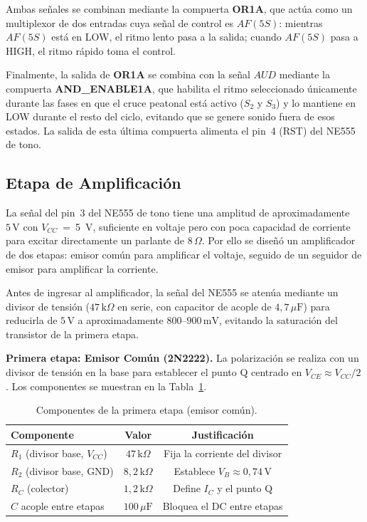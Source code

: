 \documentclass[12pt,onecolumn]{IEEEtran}
\begin{document}
Ambas señales se combinan mediante la compuerta \textbf{OR1A}, que actúa como un multiplexor de dos entradas cuya señal de control es $AF(5S)$: mientras $AF(5S)$ está en LOW, el ritmo lento pasa a la salida; cuando $AF(5S)$ pasa a HIGH, el ritmo rápido toma el control.

Finalmente, la salida de \textbf{OR1A} se combina con la señal $AUD$ mediante la compuerta \textbf{AND\_ENABLE1A}, que habilita el ritmo seleccionado únicamente durante las fases en que el cruce peatonal está activo ($S_2$ y $S_3$) y lo mantiene en LOW durante el resto del ciclo, evitando que se genere sonido fuera de esos estados. La salida de esta última compuerta alimenta el pin~4 (RST) del NE555 de tono.

\subsection{Etapa de Amplificación}

La señal del pin~3 del NE555 de tono tiene una amplitud de aproximadamente $5\,\text{V}$ con $V_{CC}$~=~\qty{5}{V}, suficiente en voltaje pero con poca capacidad de corriente para excitar directamente un parlante de $8\,\Omega$. Por ello se diseñó un amplificador de dos etapas: emisor común para amplificar el voltaje, seguido de un seguidor de emisor para amplificar la corriente.

Antes de ingresar al amplificador, la señal del NE555 se atenúa mediante un divisor de tensión ($47\,\text{k}\Omega$ en serie, con capacitor de acople de $4{,}7\,\mu\text{F}$) para reducirla de $5\,\text{V}$ a aproximadamente $800$--$900\,\text{mV}$, evitando la saturación del transistor de la primera etapa.

\textbf{Primera etapa: Emisor Común (2N2222).}
La polarización se realiza con un divisor de tensión en la base para establecer el punto Q centrado en $V_{CE} \approx V_{CC}/2$ \cite{2n2222ds}. Los componentes se muestran en la Tabla~\ref{tab:emisor_comun}.

\begin{table}[H]
\centering
\caption{Componentes de la primera etapa (emisor común).}
\label{tab:emisor_comun}
\begin{tabular}{lcc}
\toprule
\textbf{Componente} & \textbf{Valor} & \textbf{Justificación} \\
\midrule
$R_1$ (divisor base, $V_{CC}$) & $47\,\text{k}\Omega$    & Fija la corriente del divisor \\
$R_2$ (divisor base, GND)      & $8{,}2\,\text{k}\Omega$ & Establece $V_B \approx 0{,}74\,\text{V}$ \\
$R_C$ (colector)               & $1{,}2\,\text{k}\Omega$ & Define $I_C$ y el punto Q \\
$C$ acople entre etapas        & $100\,\mu\text{F}$      & Bloquea el DC entre etapas \\
\bottomrule
\end{tabular}
\end{table}
\end{document}
